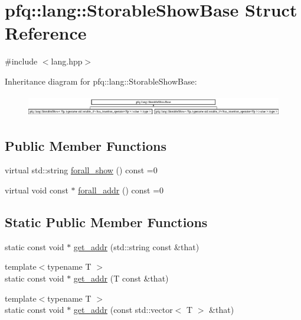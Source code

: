 \hypertarget{structpfq_1_1lang_1_1StorableShowBase}{\section{pfq\+:\+:lang\+:\+:Storable\+Show\+Base Struct Reference}
\label{structpfq_1_1lang_1_1StorableShowBase}
}


{\ttfamily \#include $<$lang.\+hpp$>$}

Inheritance diagram for pfq\+:\+:lang\+:\+:Storable\+Show\+Base\+:\begin{figure}[H]
\begin{center}
\leavevmode
\includegraphics[height=0.957265cm]{structpfq_1_1lang_1_1StorableShowBase}
\end{center}
\end{figure}
\subsection*{Public Member Functions}
\begin{DoxyCompactItemize}
\item 
virtual std\+::string \hyperlink{structpfq_1_1lang_1_1StorableShowBase_a1c6d20492a999c961c1120dce33a131d}{forall\+\_\+show} () const =0
\item 
virtual void const $\ast$ \hyperlink{structpfq_1_1lang_1_1StorableShowBase_a4b7712509609a2cb18dccf6b699d6ed9}{forall\+\_\+addr} () const =0
\end{DoxyCompactItemize}
\subsection*{Static Public Member Functions}
\begin{DoxyCompactItemize}
\item 
static const void $\ast$ \hyperlink{structpfq_1_1lang_1_1StorableShowBase_a716426f3a3c0a37e5cbce068dc18cda5}{get\+\_\+addr} (std\+::string const \&that)
\item 
{\footnotesize template$<$typename T $>$ }\\static const void $\ast$ \hyperlink{structpfq_1_1lang_1_1StorableShowBase_abbf4497b2a5de3ee38e9ee1c7ffd734d}{get\+\_\+addr} (T const \&that)
\item 
{\footnotesize template$<$typename T $>$ }\\static const void $\ast$ \hyperlink{structpfq_1_1lang_1_1StorableShowBase_a4bc431bc15a71b7ae20964e2685a35cf}{get\+\_\+addr} (const std\+::vector$<$ T $>$ \&that)
\end{DoxyCompactItemize}


